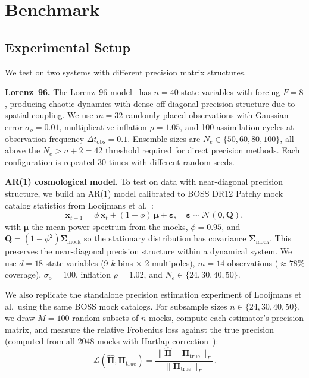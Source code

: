 \section{Benchmark}
\label{sec:benchmark}

\subsection{Experimental Setup}
\label{sec:setup}

We test on two systems with different precision matrix structures.

\textbf{Lorenz~96.} The Lorenz~96 model~\cite{lorenz1996predictability} has $n = 40$ state variables with forcing $F = 8$, producing chaotic dynamics with dense off-diagonal precision structure due to spatial coupling. We use $m = 32$ randomly placed observations with Gaussian error $\sigma_o = 0.01$, multiplicative inflation $\rho = 1.05$, and 100 assimilation cycles at observation frequency $\Delta t_{\text{obs}} = 0.1$. Ensemble sizes are $N_e \in \{50, 60, 80, 100\}$, all above the $N_e > n + 2 = 42$ threshold required for direct precision methods. Each configuration is repeated 30 times with different random seeds.

\textbf{AR(1) cosmological model.} To test on data with near-diagonal precision structure, we build an AR(1) model calibrated to BOSS DR12 Patchy mock catalog statistics from Looijmans et al.~\cite{looijmans2024comparison}:
\begin{equation}
\label{eq:ar1}
\mathbf{x}_{t+1} = \phi \, \mathbf{x}_t + (1 - \phi) \, \boldsymbol{\mu} + \boldsymbol{\varepsilon}, \quad \boldsymbol{\varepsilon} \sim \mathcal{N}(\mathbf{0}, \mathbf{Q}),
\end{equation}
with $\boldsymbol{\mu}$ the mean power spectrum from the mocks, $\phi = 0.95$, and $\mathbf{Q} = (1 - \phi^2) \boldsymbol{\Sigma}_{\text{mock}}$ so the stationary distribution has covariance $\boldsymbol{\Sigma}_{\text{mock}}$. This preserves the near-diagonal precision structure within a dynamical system. We use $d = 18$ state variables (9 $k$-bins $\times$ 2 multipoles), $m = 14$ observations ($\approx 78\%$ coverage), $\sigma_o = 100$, inflation $\rho = 1.02$, and $N_e \in \{24, 30, 40, 50\}$.

We also replicate the standalone precision estimation experiment of Looijmans et al.\ using the same BOSS mock catalogs. For subsample sizes $n \in \{24, 30, 40, 50\}$, we draw $M = 100$ random subsets of $n$ mocks, compute each estimator's precision matrix, and measure the relative Frobenius loss against the true precision (computed from all 2048 mocks with Hartlap correction~\cite{hartlap2007your}):
\begin{equation}
\label{eq:matrix_loss}
\mathcal{L}(\hat{\boldsymbol{\Pi}}, \boldsymbol{\Pi}_{\text{true}}) = \frac{\|\hat{\boldsymbol{\Pi}} - \boldsymbol{\Pi}_{\text{true}}\|_F}{\|\boldsymbol{\Pi}_{\text{true}}\|_F}.
\end{equation}

